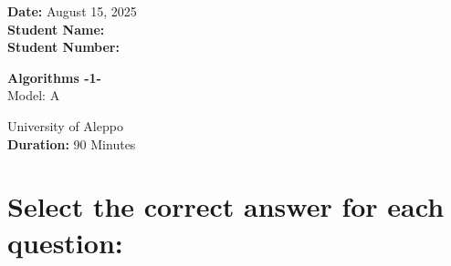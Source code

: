 \documentclass[12pt]{article}
\begin{document}
\begin{minipage}[t]{0.3\textwidth}
    \textbf{Date:} August 15, 2025\\[0.5em]
    \textbf{Student Name: }\\[0.5em]
    \textbf{Student Number: }
\end{minipage}
\begin{minipage}[t]{0.3\textwidth}
    \centering
    \Large\textbf{Algorithms -1-}\\[0.5em]
    \Large{Model:} A\\[0.5em]
\end{minipage}\hfill
\begin{minipage}[t]{0.3\textwidth}
    \raggedleft
    University of Aleppo\\[0.5em]
    \textbf{Duration: }90 Minutes
\end{minipage}

\vspace{1.5cm}

\section*{\small Select the correct answer for each question:}
\end{document}
